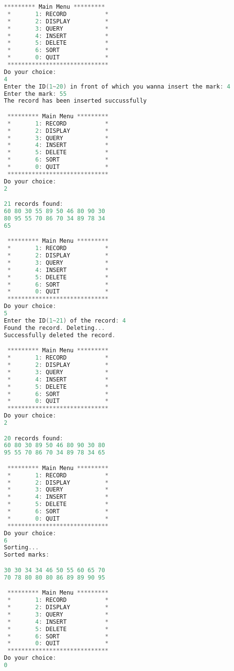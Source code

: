 \documentclass[14pt,aps,prb]{revtex4}
\begin{document}
\begin{spacing}{1.5}
\begin{lstlisting}[language=C++]
 ********* Main Menu *********
 *       1: RECORD           *
 *       2: DISPLAY          *
 *       3: QUERY            *
 *       4: INSERT           *
 *       5: DELETE           *
 *       6: SORT             *
 *       0: QUIT             *
 *****************************
Do your choice: 
4
Enter the ID(1~20) in front of which you wanna insert the mark: 4
Enter the mark: 55
The record has been inserted succussfully

 ********* Main Menu *********
 *       1: RECORD           *
 *       2: DISPLAY          *
 *       3: QUERY            *
 *       4: INSERT           *
 *       5: DELETE           *
 *       6: SORT             *
 *       0: QUIT             *
 *****************************
Do your choice: 
2

21 records found: 
60 80 30 55 89 50 46 80 90 30 
80 95 55 70 86 70 34 89 78 34 
65 

 ********* Main Menu *********
 *       1: RECORD           *
 *       2: DISPLAY          *
 *       3: QUERY            *
 *       4: INSERT           *
 *       5: DELETE           *
 *       6: SORT             *
 *       0: QUIT             *
 *****************************
Do your choice: 
5
Enter the ID(1~21) of the record: 4
Found the record. Deleting...
Successfully deleted the record.

 ********* Main Menu *********
 *       1: RECORD           *
 *       2: DISPLAY          *
 *       3: QUERY            *
 *       4: INSERT           *
 *       5: DELETE           *
 *       6: SORT             *
 *       0: QUIT             *
 *****************************
Do your choice: 
2

20 records found: 
60 80 30 89 50 46 80 90 30 80 
95 55 70 86 70 34 89 78 34 65 

 ********* Main Menu *********
 *       1: RECORD           *
 *       2: DISPLAY          *
 *       3: QUERY            *
 *       4: INSERT           *
 *       5: DELETE           *
 *       6: SORT             *
 *       0: QUIT             *
 *****************************
Do your choice: 
6
Sorting...
Sorted marks: 

30 30 34 34 46 50 55 60 65 70 
70 78 80 80 80 86 89 89 90 95 

 ********* Main Menu *********
 *       1: RECORD           *
 *       2: DISPLAY          *
 *       3: QUERY            *
 *       4: INSERT           *
 *       5: DELETE           *
 *       6: SORT             *
 *       0: QUIT             *
 *****************************
Do your choice: 
0
\end{lstlisting}

\end{spacing}
\end{document}
